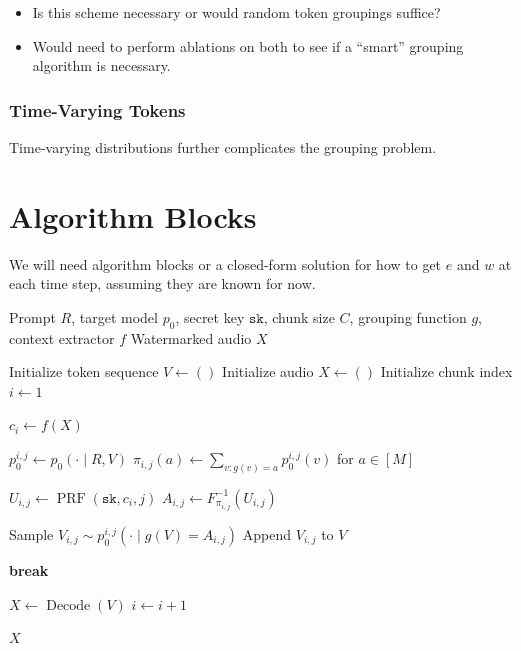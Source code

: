 \documentclass[12pt]{article}
\newcommand{\sk}{\texttt{sk}}
\theoremstyle{plain}
\theoremstyle{definition}
\begin{document}
\begin{itemize}
    \item Is this scheme necessary or would random token groupings suffice?
    \item Would need to perform ablations on both to see if a ``smart'' grouping algorithm is necessary.
\end{itemize}


\subsubsection{Time-Varying Tokens}
Time-varying distributions further complicates the grouping problem.

\section{Algorithm Blocks}


\begin{algorithm}[H]
\caption{Watermark Embedding}

We will need algorithm blocks or a closed-form solution for how to get $e$ and $w$ at each time step, assuming they are known for now.

\label{alg:watermark_embedding}
\begin{algorithmic}[1]
\Require Prompt $R$, target model $p_0$, secret key $\sk$,
    chunk size $C$, grouping function $g$,
    context extractor $f$
\Ensure Watermarked audio $X$

\State Initialize token sequence $V\gets()$
\State Initialize audio $X\gets()$
\State Initialize chunk index $i\gets 1$

    \State $c_i\gets f(X)$

        \State $p_0^{i,j}\gets p_0(\cdot\mid R,V)$
        \State $\pi_{i,j}(a)\gets
            \sum_{v:g(v)=a}p_0^{i,j}(v)$
            for $a\in[M]$

        \State $U_{i,j}\gets
            \operatorname{PRF}(\sk,c_i,j)$
        \State $A_{i,j}\gets
            F^{-1}_{\pi_{i,j}}(U_{i,j})$

        \State Sample $V_{i,j}\sim
            p_0^{i,j}(\cdot\mid g(V)=A_{i,j})$
        \State Append $V_{i,j}$ to $V$

            \State \textbf{break}
        \EndIf
    \EndFor

    \State $X\gets\operatorname{Decode}(V)$
    \State $i\gets i+1$
\EndWhile

\State \Return $X$
\end{algorithmic}
\end{algorithm}
\end{document}
